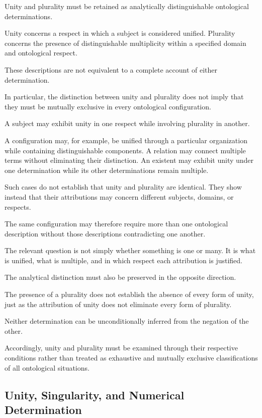Unity and plurality must be retained
as analytically distinguishable
ontological determinations.

Unity concerns a respect in which
a subject is considered unified.
Plurality concerns the presence
of distinguishable multiplicity
within a specified domain and
ontological respect.

These descriptions are not equivalent
to a complete account of either
determination.

In particular, the distinction
between unity and plurality does
not imply that they must be mutually
exclusive in every ontological
configuration.

A subject may exhibit unity in
one respect while involving plurality
in another.

A configuration may, for example,
be unified through a particular
organization while containing
distinguishable components.
A relation may connect multiple
terms without eliminating their
distinction.
An existent may exhibit unity under
one determination while its other
determinations remain multiple.

Such cases do not establish that
unity and plurality are identical.
They show instead that their
attributions may concern different
subjects, domains, or respects.

The same configuration may therefore
require more than one ontological
description without those descriptions
contradicting one another.

The relevant question is not simply
whether something is one or many.
It is what is unified, what is multiple,
and in which respect each attribution
is justified.

The analytical distinction must
also be preserved in the opposite
direction.

The presence of a plurality does
not establish the absence of every
form of unity, just as the attribution
of unity does not eliminate every
form of plurality.

Neither determination can be
unconditionally inferred from
the negation of the other.

Accordingly, unity and plurality
must be examined through their
respective conditions rather than
treated as exhaustive and mutually
exclusive classifications of all
ontological situations.

\subsection{Unity, Singularity, and Numerical Determination}

